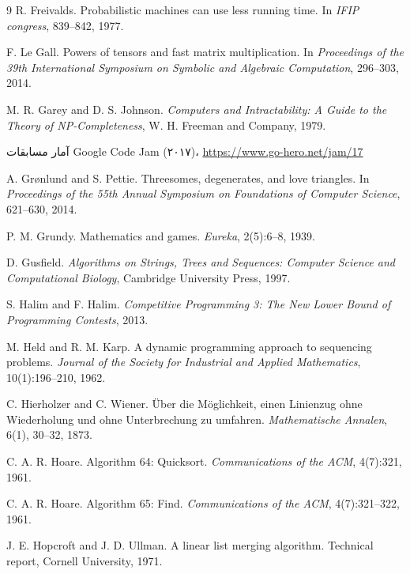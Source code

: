 \begin{thebibliography}{9}
  R. Freivalds.
  Probabilistic machines can use less running time.
  In \emph{IFIP congress}, 839--842, 1977.

  F. Le Gall.
  Powers of tensors and fast matrix multiplication.
  In \emph{Proceedings of the 39th International Symposium on Symbolic and Algebraic Computation},
  296--303, 2014.

  M. R. Garey and D. S. Johnson.
  \emph{Computers and Intractability:
  A Guide to the Theory of NP-Completeness},
  W. H. Freeman and Company, 1979.

  آمار مسابقات Google Code Jam (۲۰۱۷)،
  \url{https://www.go-hero.net/jam/17}

  A. Grønlund and S. Pettie.
  Threesomes, degenerates, and love triangles.
  In \emph{Proceedings of the 55th Annual Symposium on Foundations of Computer Science},
  621--630, 2014.

  P. M. Grundy.
  Mathematics and games.
  \emph{Eureka}, 2(5):6--8, 1939.

  D. Gusfield.
  \emph{Algorithms on Strings, Trees and Sequences:
  Computer Science and Computational Biology},
  Cambridge University Press, 1997.


  S. Halim and F. Halim.
  \emph{Competitive Programming 3: The New Lower Bound of Programming Contests}, 2013.

  M. Held and R. M. Karp.
  A dynamic programming approach to sequencing problems.
  \emph{Journal of the Society for Industrial and Applied Mathematics}, 10(1):196--210, 1962.

  C. Hierholzer and C. Wiener.
  Über die Möglichkeit, einen Linienzug ohne Wiederholung und ohne Unterbrechung zu umfahren.
  \emph{Mathematische Annalen}, 6(1), 30--32, 1873.

  C. A. R. Hoare.
  Algorithm 64: Quicksort.
  \emph{Communications of the ACM}, 4(7):321, 1961.

  C. A. R. Hoare.
  Algorithm 65: Find.
  \emph{Communications of the ACM}, 4(7):321--322, 1961.

  J. E. Hopcroft and J. D. Ullman.
  A linear list merging algorithm.
  Technical report, Cornell University, 1971.


\end{thebibliography}
